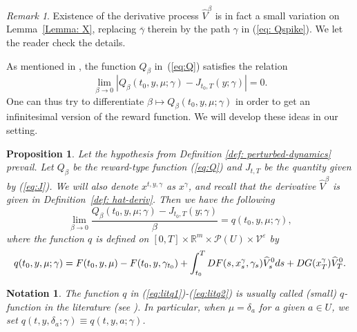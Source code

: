 \documentclass[12pt,reqno]{amsart}
\numberwithin{equation}{section}  %
\newcommand{\1}{{\bf 1}}
\newcommand{\2}{{\bf 2}}
\newcommand{\R}{\mathbb R}
\newcommand{\ga}{\gamma}
\newcommand{\lln}{\left|}
\newcommand{\rrn}{\right|}
\newtheorem{notation}[theorem]{Notation}
\newtheorem{proposition}[theorem]{Proposition}
\theoremstyle{remark}
\newtheorem{remark}[theorem]{Remark}
\theoremstyle{remark}
\begin{document}
\begin{remark}
    Existence of the derivative process $\hat{V}^{\beta}$ is in fact a small variation on Lemma~\ref{Lemma: X}, replacing $\overline{\ga}$ therein by the path $\ga$ in (\ref{eq: Qspike}). We let the reader check the details.
\end{remark}

As mentioned in \cite{jia2023qlearning}, the function $Q_{\beta}$ in~(\ref{eq:Q}) satisfies the relation
\[\lim_{\beta \to 0} \lln Q_{\beta}(t_{0},y,\mu;\ga)-J_{t_{0},T}(y;\ga) \rrn=0.
\]
One can thus try to differentiate $\beta\mapsto Q_{\beta}(t_{0},y,\mu;\ga)$ in order to get an infinitesimal version of the reward function. We will develop these ideas in our setting.

\begin{proposition}\label{prop:q1}
Let the hypothesis from Definition \ref{def: perturbed-dynamics} prevail. Let $Q_{\beta}$ be the reward-type function (\ref{eq:Q}) and $J_{t,T}$ be the quantity given by (\ref{eq:J}). We will also denote $x^{t,y,\ga}$ as $x^{\ga}$, and recall that the derivative $\widehat{V}^{\beta}$ is given in Definition~\ref{def: hat-deriv}. Then we have the following 
\begin{equation}\label{eq:litq1}
    \lim_{\beta \to 0}\frac{Q_{\beta}(t_0,y,\mu;\ga)-J_{t_0,T}(y;\ga)}{\beta}=q(t_{0},y,\mu;\ga),
\end{equation}
where the function $q$ is defined on $[0,T]\times \R^{m}\times \mathcal{P}(U)\times \mathcal{V}^{\varepsilon}$ by
\begin{equation}\label{eq:litq2}
    q(t_{0},y,\mu;\ga)=F(t_0,y,\mu)-F(t_0,y,\ga_{t_{0}})\\+\int_{t_0}^{T}DF(s,x_{s}^{\ga},\ga_{s})\widehat{V}^{0}_{s}ds  +DG(x_{T}^{\ga})\widehat{V}^{0}_{T}.
\end{equation}
\end{proposition}
\begin{notation}\label{not:q-a}
    The function $q$ in (\ref{eq:litq1})-(\ref{eq:litq2}) is usually called (small) $q$-function in the literature (see \cite{jia2023qlearning}). In particular, when $\mu=\delta_{a}$ for a given $a\in U$, we set $q(t,y,\delta_{a};\ga)\equiv q(t,y,a;\ga)$. 
\end{notation}
\end{document}

